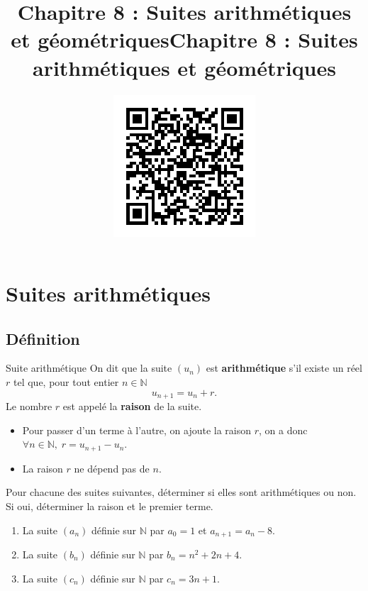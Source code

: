 \documentclass[11pt]{article}
\title{Chapitre 8 : Suites arithmétiques et géométriques}
\date{}
\author{}
\title{\vspace{-20mm}Chapitre 8 : Suites arithmétiques et géométriques}
\date{\vspace{-14mm}
\href{https://erou.forge.aeif.fr/spe-1e/suites-arith-geom.html}{
  \includegraphics[scale=.6]{qrcode.png}}
\vspace{-14mm}}
\author{}
\begin{document}
\maketitle\thispagestyle{fancy}

\section{Suites arithmétiques}
\subsection{Définition}
\begin{defi}{Suite arithmétique}
  On dit que la suite $(u_n)$ est \textbf{arithmétique} s'il existe un réel
  $r$ tel que, pour tout entier $n\in\mathbb{N}$
  \[
    u_{n+1} = u_n + r.
  \]
  Le nombre $r$ est appelé la \textbf{raison} de la suite.

  \begin{center}
  \end{center}
\end{defi}

\begin{rmq}
  \begin{itemize}
    \item Pour passer d'un terme à l'autre, on ajoute la raison $r$, on a donc
      $\forall n\in\mathbb{N},\;r=u_{n+1}-u_n$.
    \item La raison $r$ ne dépend pas de $n$.
  \end{itemize}
\end{rmq}

\begin{app}
  Pour chacune des suites suivantes, déterminer si elles sont arithmétiques ou
  non. Si oui, déterminer la raison et le premier terme.
  \begin{enumerate}
    \item La suite $(a_n)$ définie sur $\mathbb{N}$ par $a_0=1$ et
      $a_{n+1}=a_n-8$.
    \item La suite $(b_n)$ définie sur $\mathbb{N}$ par $b_n=n^2+2n+4$.
    \item La suite $(c_n)$ définie sur $\mathbb{N}$ par $c_n=3n+1$.
  \end{enumerate}
\end{app}
\end{document}
